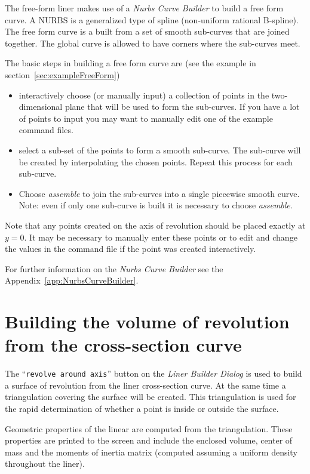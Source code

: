\documentclass[12pt]{article}
\newcommand{\cmd}[1]{``{\tt #1}''}
\begin{document}
The free-form liner makes use of a {\em Nurbs Curve Builder} to build a free form curve.
A NURBS is a generalized type of spline (non-uniform rational B-spline).
The free form curve is a built from a set of smooth sub-curves that are joined together.
The global curve is allowed to have corners where the sub-curves meet. 

The basic steps in building a free form curve are (see the example in section~\ref{sec:exampleFreeForm})
\begin{itemize}
  \item interactively choose (or manually input) a collection of points in the two-dimensional plane
        that will be used to form the sub-curves. If you have a lot of points to input you may want
        to manually edit one of the example command files.
  \item select a sub-set of the points to form a smooth sub-curve. The sub-curve will be created
        by interpolating the chosen points. Repeat this process for each sub-curve.
  \item Choose {\em assemble} to join the sub-curves into a single piecewise smooth curve.
        Note: even if only one sub-curve is built it is necessary to choose {\em assemble}.
\end{itemize}

Note that any points created on the axis of revolution should be placed exactly at $y=0$. It may be
necessary to manually enter these points or to edit and change the values in the command file
if the point was created interactively.

For further information on the {\em Nurbs Curve Builder} see the Appendix~\ref{app:NurbsCurveBuilder}.

\clearpage
\section{Building the volume of revolution from the cross-section curve}

The \cmd{revolve around axis} button on the {\em Liner Builder Dialog}
is used to build a surface of revolution from the liner cross-section
curve.  At the same time a triangulation covering the surface will be
created. This triangulation is used for the rapid determination of
whether a point is inside or outside the surface.

Geometric properties of the linear are computed from the triangulation.
These properties are printed to the screen and include the enclosed
volume, center of mass and the moments of inertia matrix (computed
assuming a uniform density throughout the liner). 
\end{document}
